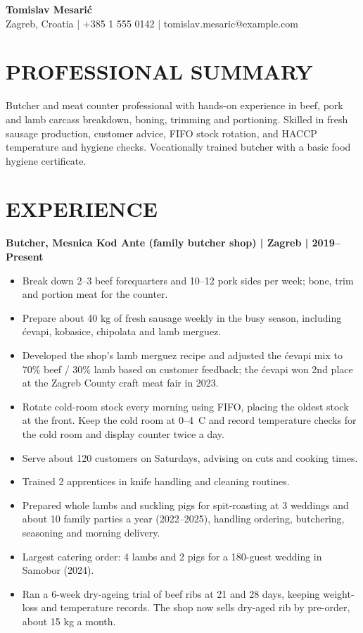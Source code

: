 \documentclass[11pt,a4paper]{article}
\begin{document}
\begin{center}
{\Huge\bfseries\color{primarycolor} Tomislav Mesarić}\\[0.35em]
{\small\color{accentcolor} Zagreb, Croatia | +385 1 555 0142 | tomislav.mesaric@example.com}
\end{center}
\vspace{-0.3em}

\section*{PROFESSIONAL SUMMARY}
Butcher and meat counter professional with hands-on experience in beef, pork and lamb carcass breakdown, boning, trimming and portioning. Skilled in fresh sausage production, customer advice, FIFO stock rotation, and HACCP temperature and hygiene checks. Vocationally trained butcher with a basic food hygiene certificate.

\section*{EXPERIENCE}
\textbf{Butcher, Mesnica Kod Ante (family butcher shop) | Zagreb | 2019–Present}
\begin{itemize}
\item Break down 2–3 beef forequarters and 10–12 pork sides per week; bone, trim and portion meat for the counter.
\item Prepare about 40 kg of fresh sausage weekly in the busy season, including ćevapi, kobasice, chipolata and lamb merguez.
\item Developed the shop’s lamb merguez recipe and adjusted the ćevapi mix to 70\% beef / 30\% lamb based on customer feedback; the ćevapi won 2nd place at the Zagreb County craft meat fair in 2023.
\item Rotate cold-room stock every morning using FIFO, placing the oldest stock at the front. Keep the cold room at 0–4~\textdegree C and record temperature checks for the cold room and display counter twice a day.
\item Serve about 120 customers on Saturdays, advising on cuts and cooking times.
\item Trained 2 apprentices in knife handling and cleaning routines.
\item Prepared whole lambs and suckling pigs for spit-roasting at 3 weddings and about 10 family parties a year (2022–2025), handling ordering, butchering, seasoning and morning delivery.
\item Largest catering order: 4 lambs and 2 pigs for a 180-guest wedding in Samobor (2024).
\item Ran a 6-week dry-ageing trial of beef ribs at 21 and 28 days, keeping weight-loss and temperature records. The shop now sells dry-aged rib by pre-order, about 15 kg a month.
\end{itemize}
\end{document}
